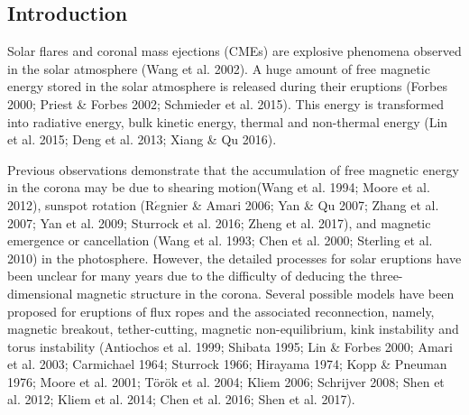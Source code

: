 \documentclass[12pt,preprint]{aastex}
\begin{document}
\begin{CJK*}{UTF8}{gbsn}
\begin{abstract}
\end{abstract}


\section{Introduction}
Solar flares and coronal mass ejections (CMEs) are explosive phenomena observed in the solar atmosphere (Wang et al. 2002). A huge amount of free magnetic energy stored in the solar atmosphere is released during their eruptions (Forbes 2000; Priest \& Forbes 2002; Schmieder et al. 2015). This energy is transformed into radiative energy, bulk kinetic energy, thermal and non-thermal energy (Lin et al. 2015; Deng et al. 2013; Xiang \& Qu 2016). 

Previous observations demonstrate that the accumulation of free magnetic energy in the corona may be due to shearing motion(Wang et al. 1994; Moore et al. 2012), sunspot rotation (R$\acute{e}$gnier \& Amari 2006; Yan \& Qu 2007; Zhang et al. 2007; Yan et al. 2009; Sturrock et al. 2016; Zheng et al. 2017), and magnetic emergence or cancellation (Wang et al. 1993; Chen et al. 2000; Sterling et al. 2010) in the photosphere. However, the detailed processes for solar eruptions have been unclear for many years due to the difficulty of deducing the three-dimensional magnetic structure in the corona. Several possible models have been proposed for eruptions of flux ropes and the associated reconnection, namely, magnetic breakout, tether-cutting, magnetic non-equilibrium, kink instability and torus instability (Antiochos et al. 1999; Shibata 1995; Lin \& Forbes 2000; Amari et al. 2003; Carmichael 1964; Sturrock 1966; Hirayama 1974; Kopp \& Pneuman 1976; Moore et al. 2001; T{\"o}r{\"o}k et al. 2004; Kliem 2006; Schrijver 2008; Shen et al. 2012; Kliem et al. 2014; Chen et al. 2016; Shen et al. 2017). 


\end{CJK*}
\end{document}
